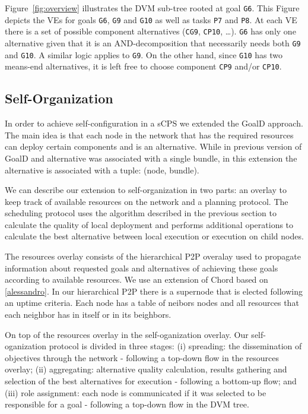 \documentclass[conference]{IEEEtran}
\begin{document}
Figure~\ref{fig:overview} illustrates the DVM sub-tree rooted at goal \texttt{G6}. This Figure depicts the VEs for goals \texttt{G6}, \texttt{G9} and \texttt{G10} as well as tasks \texttt{P7} and \texttt{P8}. At each VE there is a set of possible component alternatives (\texttt{CG9}, \texttt{CP10}, \ldots). \texttt{G6} has only one alternative given that it is an AND-decomposition that necessarily needs both \texttt{G9} and \texttt{G10}. A similar logic applies to \texttt{G9}. On the other hand, since \texttt{G10} has two means-end alternatives, it is left free to choose component \texttt{CP9} and/or \texttt{CP10}.






\subsection{Self-Organization}
\label{self_organization}

In order to achieve self-configuration in a sCPS we extended the GoalD approach. The main idea is that each node in the network that has the required resources can deploy certain components and is an alternative. While in previous version of GoalD and alternative was associated with a single bundle, in this extension the alternative is associated with a tuple: (node, bundle). 


We can describe our extension to self-organization in two parts: an overlay to keep track of available resources on the network and a planning protocol. The scheduling protocol uses the algorithm described in the previous section to calculate the quality of local deployment and performs additional operations to calculate the best alternative between local execution or execution on child nodes.

The resources overlay consists of the hierarchical P2P overalay used to propagate information about requested goals and alternatives of achieving these goals according to available resources. We use an extension of Chord based on \ref{alessandro}. In our hierarchical P2P there is a supernode that is elected following an uptime criteria. Each node has a table of neibors nodes and all resources that each neighbor has in itself or in its beighbors.


On top of the resources overlay in the self-oganization overlay. Our self-oganization protocol is divided in three stages: (i) spreading: the dissemination of objectives through the network - following a top-down flow in the resources overlay; (ii) aggregating: alternative quality calculation, results gathering and selection of the best alternatives for execution - following a bottom-up flow; and (iii) role assignment: each node is communicated if it was selected to be responsible for a goal - following a top-down flow in the DVM tree. 
\end{document}
